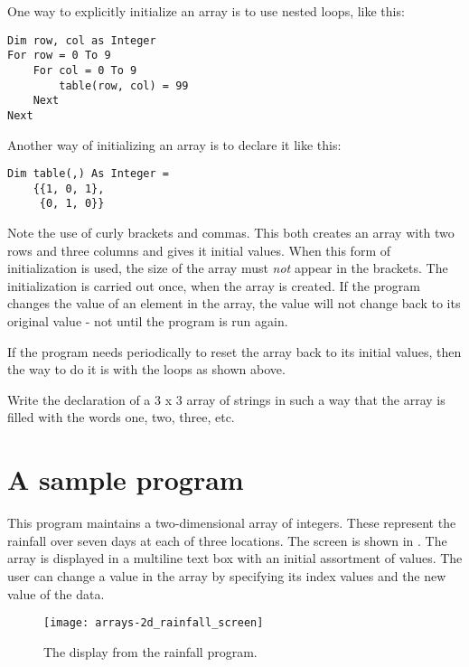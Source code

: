 		One way to explicitly initialize an array is to use nested loops, like this:
		\begin{lstlisting}
Dim row, col as Integer
For row = 0 To 9
	For col = 0 To 9
		table(row, col) = 99
	Next
Next
		\end{lstlisting}
		Another way of initializing an array is to declare it like this:
		\begin{lstlisting}
Dim table(,) As Integer =
	{{1, 0, 1},
	 {0, 1, 0}}
		\end{lstlisting}
		Note the use of curly brackets and commas. This both creates an array with two rows and three columns and gives it initial values. When this form of initialization is used, the size of the array must \emph{not} appear in the brackets. The initialization is carried out once, when the array is created. If the program changes the value of an element in the array, the value will not change back to its original value - not until the program is run again.
		
		If the program needs periodically to reset the array back to its initial values, then the way to do it is with the  loops as shown above.

		\begin{stqb}
			\begin{STQ}
			\item Write the declaration of a 3 x 3 array of strings in such a way that the array is filled with the words one, two, three, etc.
			\end{STQ}
		\end{stqb}


	\section{A sample program}
		This program maintains a two-dimensional array of integers. These represent the rainfall over seven days at each of three locations. The screen is shown in . The array is displayed in a multiline text box with an initial assortment of values. The user can change a value in the array by specifying its index values and the new value of the data.
		\begin{figure}[bth]
			\centering
			\texttt{[image: arrays-2d\_rainfall\_screen]}
			\caption{The display from the rainfall program.}
			\label{fig:arrays-2d_rainfall_screen}
		\end{figure}

